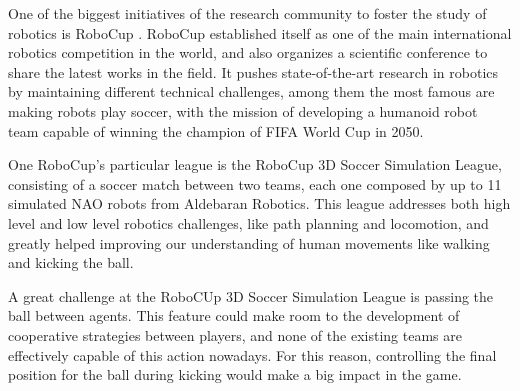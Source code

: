 
One of the biggest initiatives of the research community to foster the study of robotics is RoboCup \cite{robocup}. RoboCup established itself as one of the main international robotics competition in the world, and also organizes a scientific conference to share the latest works in the field. It pushes state-of-the-art research in robotics by maintaining different technical challenges, among them the most famous are making robots play soccer, with the mission of developing a humanoid robot team capable of winning the champion of FIFA World Cup in 2050.

One RoboCup's particular league is the RoboCup 3D Soccer Simulation League, consisting of a soccer match between two teams, each one composed by up to 11 simulated NAO robots from Aldebaran Robotics. This league addresses both high level and low level robotics challenges, like path planning and locomotion, and greatly helped improving our understanding of human movements like walking and kicking the ball.

A great challenge at the RoboCUp 3D Soccer Simulation League is passing the ball between agents. This feature could make room to the development of cooperative strategies between players, and none of the existing teams are effectively capable of this action nowadays. For this reason, controlling the final position for the ball during kicking would make a big impact in the game.

